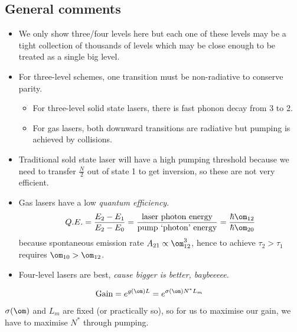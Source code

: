 \documentclass[a4paper, 11pt, normalem]{report}
\begin{document}
\subsection{General comments}
\begin{itemize}
    \item We only show three/four levels here but each one of these levels may be a tight collection of thousands of levels which may be close enough to be treated as a single big level.
    \item For three-level schemes, one transition must be non-radiative to conserve parity.
        \begin{itemize}
            \item For three-level solid state lasers, there is fast phonon decay from 3 to 2.
            \item For gas lasers, both downward transitions are radiative but pumping is achieved by collisions.
        \end{itemize}
    \item Traditional sold state laser will have a high pumping threshold because we need to transfer $\frac{N}{2}$ out of state 1 to get inversion, so these are not very efficient.
    \item Gas lasers have a low \emph{quantum efficiency}.
        \begin{equation}
            Q.E. = \frac{E_2-E_1}{E_2-E_0} = \frac{\text{laser photon energy}}{\text{pump `photon' energy}} = \frac{\hbar\om_{12}}{\hbar\om_{20}}
        \end{equation}
        because spontaneous emission rate $A_{21}\propto\om_{12}^3$, hence to achieve $\tau_2>\tau_1$ requires $\om_{10}>\om_{12}$.
    \item Four-level lasers are best, \emph{cause bigger is better, baybeeeee.}
\end{itemize}
\begin{align}
    \text{Gain} &= e^{g(\om)L} = e^{\sigma(\om)N^*L_m}
\end{align}
$\sigma(\om)$ and $L_m$ are fixed (or practically so), so for us to maximise our gain, we have to maximise $N^*$ through pumping. 
\end{document}
